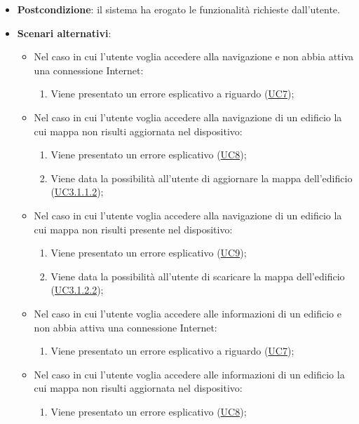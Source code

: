 \documentclass[../AnalisiDeiRequisiti.tex]{subfiles}
\begin{document}
\begin{itemize}
\begin{enumerate}
	\end{enumerate}
	\item \textbf{Postcondizione}: il sistema ha erogato le funzionalità richieste dall'utente.
	\item \textbf{Scenari alternativi}: 
	\begin{itemize}
		\item Nel caso in cui l'utente voglia accedere alla navigazione e non abbia attiva una connessione Internet: 
		\begin{enumerate}
			\item Viene presentato un errore esplicativo a riguardo (\hyperlink{UC7}{UC7});
		\end{enumerate}
		\item Nel caso in cui l'utente voglia accedere alla navigazione di un edificio la cui mappa non risulti aggiornata nel dispositivo: 
		\begin{enumerate}
			\item Viene presentato un errore esplicativo (\hyperlink{UC8}{UC8});
			\item Viene data la possibilità all'utente di aggiornare la mappa dell'edificio (\hyperlink{UC3.1.1.2}{UC3.1.1.2});
		\end{enumerate}
		\item Nel caso in cui l'utente voglia accedere alla navigazione di un edificio la cui mappa non risulti presente nel dispositivo: 
		\begin{enumerate}
			\item Viene presentato un errore esplicativo (\hyperlink{UC9}{UC9});
			\item Viene data la possibilità all'utente di scaricare la mappa dell'edificio (\hyperlink{UC3.1.2.2}{UC3.1.2.2});
		\end{enumerate}
		\item Nel caso in cui l'utente voglia accedere alle informazioni di un edificio e non abbia attiva una connessione Internet: 
		\begin{enumerate}
			\item Viene presentato un errore esplicativo a riguardo (\hyperlink{UC7}{UC7});
		\end{enumerate}
		\item Nel caso in cui l'utente voglia accedere alle informazioni di un edificio la cui mappa non risulti aggiornata nel dispositivo: 
		\begin{enumerate}
			\item Viene presentato un errore esplicativo (\hyperlink{UC8}{UC8});

\end{enumerate}
\end{itemize}
\end{itemize}
\end{document}
